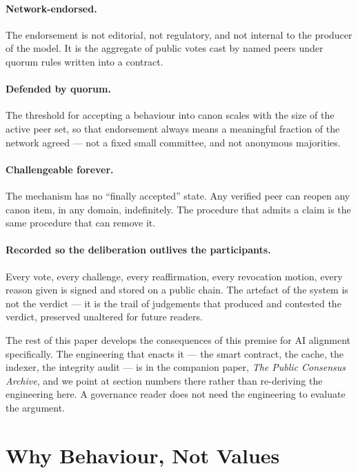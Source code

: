 \documentclass[11pt,a4paper]{article}
\begin{document}
\paragraph{Network-endorsed.} The endorsement is not editorial,
not regulatory, and not internal to the producer of the model. It
is the aggregate of public votes cast by named peers under quorum
rules written into a contract.

\paragraph{Defended by quorum.} The threshold for accepting a
behaviour into canon scales with the size of the active peer set,
so that endorsement always means a meaningful fraction of the
network agreed --- not a fixed small committee, and not anonymous
majorities.

\paragraph{Challengeable forever.} The mechanism has no
``finally accepted'' state. Any verified peer can reopen any
canon item, in any domain, indefinitely. The procedure that
admits a claim is the same procedure that can remove it.

\paragraph{Recorded so the deliberation outlives the participants.}
Every vote, every challenge, every reaffirmation, every revocation
motion, every reason given is signed and stored on a public
chain. The artefact of the system is not the verdict --- it is
the trail of judgements that produced and contested the verdict,
preserved unaltered for future readers.

The rest of this paper develops the consequences of this premise
for AI alignment specifically. The engineering that enacts it
--- the smart contract, the cache, the indexer, the integrity
audit --- is in the companion paper, \emph{The Public Consensus
Archive}, and we point at section numbers there rather than
re-deriving the engineering here. A governance reader does not
need the engineering to evaluate the argument.

\section{Why Behaviour, Not Values}
\end{document}
